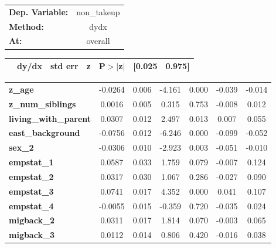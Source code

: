 \begin{center}
\begin{tabular}{lc}
\toprule
\textbf{Dep. Variable:}       &  non\_takeup    \\
\textbf{Method:}              &      dydx       \\
\textbf{At:}                  &    overall      \\
\bottomrule
\end{tabular}
\begin{tabular}{ccccccc}
          \textbf{}           & \textbf{dy/dx} & \textbf{std err} & \textbf{z} & \textbf{P$> |$z$|$} & \textbf{[0.025} & \textbf{0.975]}  \\
\midrule
\bottomrule
\end{tabular}
\begin{tabular}{lcccccc}
\textbf{z\_age}               &      -0.0264   &        0.006     &    -4.161  &         0.000        &       -0.039    &       -0.014     \\
\textbf{z\_num\_siblings}     &       0.0016   &        0.005     &     0.315  &         0.753        &       -0.008    &        0.012     \\
\textbf{living\_with\_parent} &       0.0307   &        0.012     &     2.497  &         0.013        &        0.007    &        0.055     \\
\textbf{east\_background}     &      -0.0756   &        0.012     &    -6.246  &         0.000        &       -0.099    &       -0.052     \\
\textbf{sex\_2}               &      -0.0306   &        0.010     &    -2.923  &         0.003        &       -0.051    &       -0.010     \\
\textbf{empstat\_1}           &       0.0587   &        0.033     &     1.759  &         0.079        &       -0.007    &        0.124     \\
\textbf{empstat\_2}           &       0.0317   &        0.030     &     1.067  &         0.286        &       -0.027    &        0.090     \\
\textbf{empstat\_3}           &       0.0741   &        0.017     &     4.352  &         0.000        &        0.041    &        0.107     \\
\textbf{empstat\_4}           &      -0.0055   &        0.015     &    -0.359  &         0.720        &       -0.035    &        0.024     \\
\textbf{migback\_2}           &       0.0311   &        0.017     &     1.814  &         0.070        &       -0.003    &        0.065     \\
\textbf{migback\_3}           &       0.0112   &        0.014     &     0.806  &         0.420        &       -0.016    &        0.038     \\
\bottomrule
\end{tabular}
\end{center}
